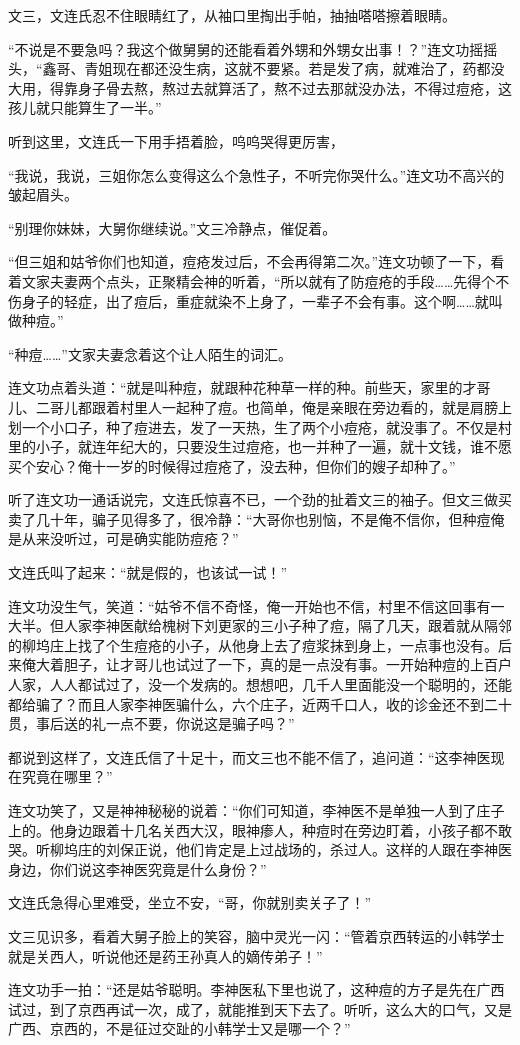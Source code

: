 文三，文连氏忍不住眼睛红了，从袖口里掏出手帕，抽抽嗒嗒擦着眼睛。

“不说是不要急吗？我这个做舅舅的还能看着外甥和外甥女出事！？”连文功摇摇头，“鑫哥、青姐现在都还没生病，这就不要紧。若是发了病，就难治了，药都没大用，得靠身子骨去熬，熬过去就算活了，熬不过去那就没办法，不得过痘疮，这孩儿就只能算生了一半。”

听到这里，文连氏一下用手捂着脸，呜呜哭得更厉害，

“我说，我说，三姐你怎么变得这么个急性子，不听完你哭什么。”连文功不高兴的皱起眉头。

“别理你妹妹，大舅你继续说。”文三冷静点，催促着。

“但三姐和姑爷你们也知道，痘疮发过后，不会再得第二次。”连文功顿了一下，看着文家夫妻两个点头，正聚精会神的听着，“所以就有了防痘疮的手段……先得个不伤身子的轻症，出了痘后，重症就染不上身了，一辈子不会有事。这个啊……就叫做种痘。”

“种痘……”文家夫妻念着这个让人陌生的词汇。

连文功点着头道：“就是叫种痘，就跟种花种草一样的种。前些天，家里的才哥儿、二哥儿都跟着村里人一起种了痘。也简单，俺是亲眼在旁边看的，就是肩膀上划一个小口子，种了痘进去，发了一天热，生了两个小痘疮，就没事了。不仅是村里的小子，就连年纪大的，只要没生过痘疮，也一并种了一遍，就十文钱，谁不愿买个安心？俺十一岁的时候得过痘疮了，没去种，但你们的嫂子却种了。”

听了连文功一通话说完，文连氏惊喜不已，一个劲的扯着文三的袖子。但文三做买卖了几十年，骗子见得多了，很冷静：“大哥你也别恼，不是俺不信你，但种痘俺是从来没听过，可是确实能防痘疮？”

文连氏叫了起来：“就是假的，也该试一试！”

连文功没生气，笑道：“姑爷不信不奇怪，俺一开始也不信，村里不信这回事有一大半。但人家李神医献给槐树下刘更家的三小子种了痘，隔了几天，跟着就从隔邻的柳坞庄上找了个生痘疮的小子，从他身上去了痘浆抹到身上，一点事也没有。后来俺大着胆子，让才哥儿也试过了一下，真的是一点没有事。一开始种痘的上百户人家，人人都试过了，没一个发病的。想想吧，几千人里面能没一个聪明的，还能都给骗了？而且人家李神医骗什么，六个庄子，近两千口人，收的诊金还不到二十贯，事后送的礼一点不要，你说这是骗子吗？”

都说到这样了，文连氏信了十足十，而文三也不能不信了，追问道：“这李神医现在究竟在哪里？”

连文功笑了，又是神神秘秘的说着：“你们可知道，李神医不是单独一人到了庄子上的。他身边跟着十几名关西大汉，眼神瘆人，种痘时在旁边盯着，小孩子都不敢哭。听柳坞庄的刘保正说，他们肯定是上过战场的，杀过人。这样的人跟在李神医身边，你们说这李神医究竟是什么身份？”

文连氏急得心里难受，坐立不安，“哥，你就别卖关子了！”

文三见识多，看着大舅子脸上的笑容，脑中灵光一闪：“管着京西转运的小韩学士就是关西人，听说他还是药王孙真人的嫡传弟子！”

连文功手一拍：“还是姑爷聪明。李神医私下里也说了，这种痘的方子是先在广西试过，到了京西再试一次，成了，就能推到天下去了。听听，这么大的口气，又是广西、京西的，不是征过交趾的小韩学士又是哪一个？”

